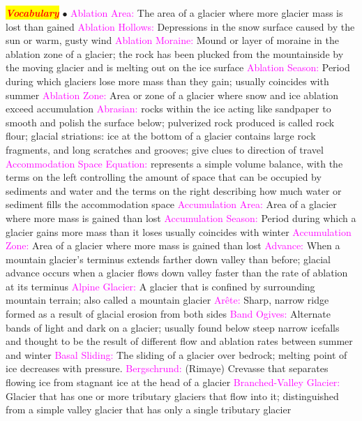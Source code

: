 \documentclass{article}
\newcommand{\ddd}{$\bullet$}
\newcommand{\red}[1]{\textcolor{red}{#1}}
\newcommand{\pink}[1]{\textcolor{magenta}{#1}}
\newcommand{\mysection}[1]{\colorbox{yellow}{\textbf{\textit{\red{#1}}}}}
\newcommand{\vocab}[1]{{\pink{#1}}}
\begin{document}
\begin{multicols*}{4}
	\pagebreak
	\mysection{Vocabulary} 
		\ddd
		\vocab{        Ablation Area: } The area of a glacier where more glacier mass is lost than gained 
		\vocab{        Ablation Hollows: } Depressions in the snow surface caused by the sun or warm, gusty wind 
		\vocab{        Ablation Moraine: } Mound or layer of moraine in the ablation zone of a glacier; the rock has been plucked from the mountainside by the moving glacier and is melting out on the ice surface 
		\vocab{        Ablation Season: } Period during which glaciers lose more mass than they gain; usually coincides with summer 
		\vocab{        Ablation Zone: } Area or zone of a glacier where snow and ice ablation exceed accumulation 
		\vocab{Abrasian: } rocks within the ice acting like sandpaper to smooth and polish the surface below; pulverized rock produced is called rock flour; glacial striations: ice at the bottom of a glacier contains large rock fragments, and long scratches and grooves; give clues to direction of travel  
		\vocab{Accommodation Space Equation:} represents a simple volume balance, with the terms on the left controlling the amount of space that can be occupied by sediments and water and the terms on the right describing how much water or sediment fills the accommodation space  
		\vocab{        Accumulation Area: } Area of a glacier where more mass is gained than lost 
		\vocab{        Accumulation Season: } Period during which a glacier gains more mass than it loses usually coincides with winter 
		\vocab{        Accumulation Zone: } Area of a glacier where more mass is gained than lost 
		\vocab{        Advance: } When a mountain glacier’s terminus extends farther down valley than before; glacial advance occurs when a glacier flows down valley faster than the rate of ablation at its terminus 
		\vocab{        Alpine Glacier: } A glacier that is confined by surrounding mountain terrain; also called a mountain glacier  
		\vocab{        Arête: } Sharp, narrow ridge formed as a result of glacial erosion from both sides   
		\vocab{        Band Ogives: } Alternate bands of light and dark on a glacier; usually found below steep narrow icefalls and thought to be the result of different flow and ablation rates between summer and winter 
		\vocab{        Basal Sliding: } The sliding of a glacier over bedrock; melting point of ice decreases with pressure.  
		\vocab{        Bergschrund: } (Rimaye) Crevasse that separates flowing ice from stagnant ice at the head of a glacier 
		\vocab{        Branched-Valley Glacier: } Glacier that has one or more tributary glaciers that flow into it; distinguished from a simple valley glacier that has only a single tributary glacier 

\end{multicols*}
\end{document}
